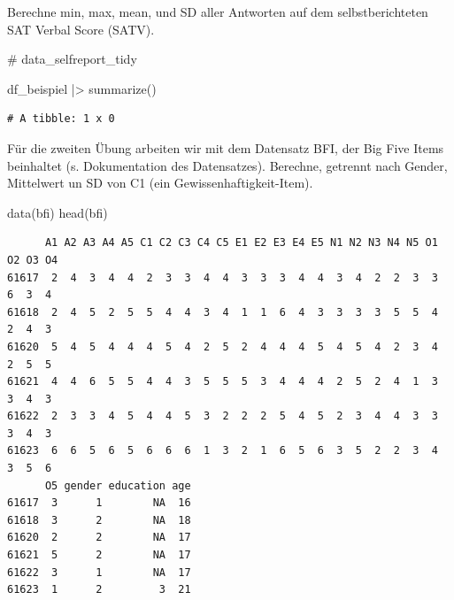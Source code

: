 \documentclass[
  letterpaper,
  DIV=11,
  numbers=noendperiod]{scrreprt}
\newenvironment{Shaded}{\begin{snugshade}}{\end{snugshade}}
\newcommand{\CommentTok}[1]{\textcolor[rgb]{0.37,0.37,0.37}{#1}}
\newcommand{\FunctionTok}[1]{\textcolor[rgb]{0.28,0.35,0.67}{#1}}
\newcommand{\NormalTok}[1]{\textcolor[rgb]{0.00,0.23,0.31}{#1}}
\newcommand{\SpecialCharTok}[1]{\textcolor[rgb]{0.37,0.37,0.37}{#1}}
\begin{document}
Berechne min, max, mean, und SD aller Antworten auf dem
selbstberichteten SAT Verbal Score (SATV).

\begin{Shaded}
\begin{Highlighting}[]
\CommentTok{\# data\_selfreport\_tidy}

\NormalTok{df\_beispiel }\SpecialCharTok{|\textgreater{}} 
  \FunctionTok{summarize}\NormalTok{()}
\end{Highlighting}
\end{Shaded}

\begin{verbatim}
# A tibble: 1 x 0
\end{verbatim}

Für die zweiten Übung arbeiten wir mit dem Datensatz BFI, der Big Five
Items beinhaltet (s. Dokumentation des Datensatzes). Berechne, getrennt
nach Gender, Mittelwert un SD von C1 (ein Gewissenhaftigkeit-Item).

\begin{Shaded}
\begin{Highlighting}[]
\FunctionTok{data}\NormalTok{(bfi)}
\FunctionTok{head}\NormalTok{(bfi)}
\end{Highlighting}
\end{Shaded}

\begin{verbatim}
      A1 A2 A3 A4 A5 C1 C2 C3 C4 C5 E1 E2 E3 E4 E5 N1 N2 N3 N4 N5 O1 O2 O3 O4
61617  2  4  3  4  4  2  3  3  4  4  3  3  3  4  4  3  4  2  2  3  3  6  3  4
61618  2  4  5  2  5  5  4  4  3  4  1  1  6  4  3  3  3  3  5  5  4  2  4  3
61620  5  4  5  4  4  4  5  4  2  5  2  4  4  4  5  4  5  4  2  3  4  2  5  5
61621  4  4  6  5  5  4  4  3  5  5  5  3  4  4  4  2  5  2  4  1  3  3  4  3
61622  2  3  3  4  5  4  4  5  3  2  2  2  5  4  5  2  3  4  4  3  3  3  4  3
61623  6  6  5  6  5  6  6  6  1  3  2  1  6  5  6  3  5  2  2  3  4  3  5  6
      O5 gender education age
61617  3      1        NA  16
61618  3      2        NA  18
61620  2      2        NA  17
61621  5      2        NA  17
61622  3      1        NA  17
61623  1      2         3  21
\end{verbatim}
\end{document}
